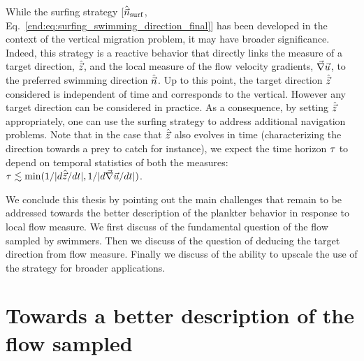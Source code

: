 While the surfing strategy [$\hat{\vec{n}}_{\mathrm{surf}}$, Eq.~\eqref{end:eq:surfing_swimming_direction_final}] has been developed in the context of the vertical migration problem, it may have broader significance.
Indeed, this strategy is a reactive behavior that directly links the measure of a target direction, $\hat{\vec{z}}$, and the local measure of the flow velocity gradients, $\vec{\nabla} \vec{u}$, to the preferred swimming direction $\hat{\vec{n}}$.
Up to this point, the target direction $\hat{\vec{z}}$ considered is independent of time and corresponds to the vertical.
However any target direction can be considered in practice.
As a consequence, by setting $\hat{\vec{z}}$ appropriately, one can use the surfing strategy to address additional navigation problems.
Note that in the case that $\hat{\vec{z}}$ also evolves in time (characterizing the direction towards a prey to catch for instance), we expect the time horizon $\tau$ to depend on temporal statistics of both the measures: $\tau \lesssim \min(1/\lvert d\hat{\vec{z}}/dt\rvert, 1/\lvert d\vec{\nabla} \vec{u}/dt\rvert)$.

We conclude this thesis by pointing out the main challenges that remain to be addressed towards the better description of the plankter behavior in response to local flow measure.
We first discuss of the fundamental question of the flow sampled by swimmers.
Then we discuss of the question of deducing the target direction from flow measure.
Finally we discuss of the ability to upscale the use of the strategy for broader applications.

\section{Towards a better description of the flow sampled}

